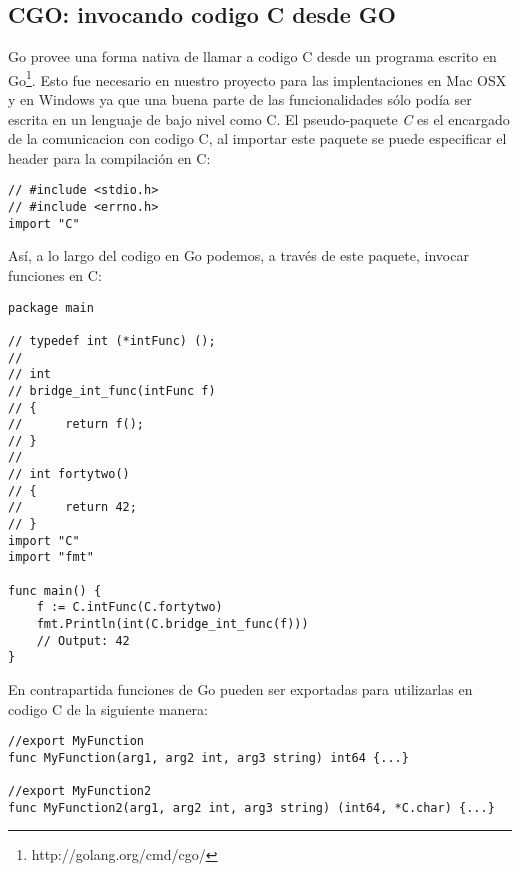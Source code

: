 \subsection{CGO: invocando codigo C desde GO}
Go provee una forma nativa de llamar a codigo C desde un programa escrito en Go\footnote{http://golang.org/cmd/cgo/}. Esto fue necesario en nuestro proyecto para las implentaciones en Mac OSX y en Windows ya que una buena parte de las funcionalidades sólo podía ser escrita en un lenguaje de bajo nivel como C.
El pseudo-paquete \textit{C} es el encargado de la comunicacion con codigo C, al importar este paquete se puede especificar el header para la compilación en C:

\begin{verbatim}
// #include <stdio.h>
// #include <errno.h>
import "C"
\end{verbatim}

Así, a lo largo del codigo en Go podemos, a través de este paquete, invocar funciones en C:

\begin{verbatim}
package main

// typedef int (*intFunc) ();
//
// int
// bridge_int_func(intFunc f)
// {
//		return f();
// }
//
// int fortytwo()
// {
//	    return 42;
// }
import "C"
import "fmt"

func main() {
	f := C.intFunc(C.fortytwo)
	fmt.Println(int(C.bridge_int_func(f)))
	// Output: 42
}
\end{verbatim}

En contrapartida funciones de Go pueden ser exportadas para utilizarlas en codigo C de la siguiente manera:

\begin{verbatim}
//export MyFunction
func MyFunction(arg1, arg2 int, arg3 string) int64 {...}

//export MyFunction2
func MyFunction2(arg1, arg2 int, arg3 string) (int64, *C.char) {...}
\end{verbatim}

